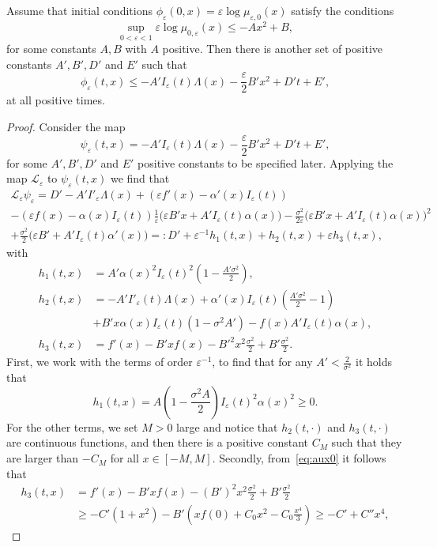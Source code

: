 \documentclass[onefignum,onetabnum]{siamart190516}
\newcommand{\1}{\mathbbm{1}}
\newcommand{\eps}{\varepsilon}
\begin{document}
\begin{proposition}
\label{prop:supersol}
Assume that initial conditions $\phi_\eps(0,x)=\eps\log\mu_{\eps,0}(x)$ satisfy the conditions
$$
\sup_{0<\eps<1}\eps\log \mu_{0,\eps}(x) \leq -Ax^2+B,
$$
for some constants $A,B$ with $A$ positive. Then there is another set of positive constants $A',B',D'$ and $E'$ such that
$$
\phi_\eps(t,x)\leq -A'I_\eps(t)\Lambda(x)-\frac{\eps}2 B'x^2+D't+E',
$$ 
at all positive times.
\end{proposition}

\begin{proof}
Consider the map
$$
\psi_\eps(t,x) = -A'I_\eps(t)\Lambda(x)-\frac{\eps}2 B'x^2+D't+E',
$$
for some $A',B',D'$ and $E'$ positive constants to be specified later. Applying the map $\mathcal L_\eps$ to $\psi_\eps(t,x)$ we find that
\begin{multline*}
\mathcal L_\eps\psi_\eps = D'-A'I'_\eps\Lambda(x)+\left(\eps f'(x) - \alpha'(x)I_{\eps}(t) \right)
\\
-  \left(\eps f(x)- \alpha(x) I_{\eps}(t)\right)\frac{1}{\eps}\Big(\eps B'x+A'I_\eps(t)\alpha(x)\Big)-\frac{\sigma^2}{2\eps}\Big(\eps B'x+A'I_\eps(t)\alpha(x)\Big)^2
\\
+\frac{\sigma^2}{2}\Big(\eps B'+A'I_\eps(t)\alpha'(x)\Big)=:D'+\eps^{-1} h_1(t,x)+h_2(t,x)+\eps h_3(t,x),
\end{multline*}
with
\begin{align*}
h_1(t,x) &= A'\alpha(x)^2I_\eps(t)^2\left(1-\frac{A'\sigma^2}{2}\right),
\\
h_2(t,x) &= -A'I'_\eps(t)\Lambda(x)+\alpha'(x)I_\eps(t)\left(\frac{A'\sigma^2}{2}-1\right)
\\
&+B'x\alpha(x)I_\eps(t)(1-\sigma^2 A') -f(x)A'I_\eps(t)\alpha(x),
\\
h_3(t,x) &= f'(x) - B'xf(x) - B'^2x^2\frac{\sigma^2}{2}+ B'\frac{\sigma^2}{2}.
\end{align*}
First, we work with the terms of order $\eps^{-1}$, to find that for any $A'<\frac{2}{\sigma^2}$ it holds that
$$
h_1(t,x)= A\left(1-\frac{\sigma^2 A}{2}\right)I_\eps(t)^2\alpha(x)^2\geq0.
$$
For the other terms, we set $M>0$ large and notice that $h_2(t,\cdot)$ and $h_3(t,\cdot)$ are continuous functions, and then there is a positive constant $C_M$ such that they are larger than $-C_M$ for all $x\in[-M,M]$. Secondly, from~\eqref{eq:aux0} it follows that
\begin{align*}
h_3(t,x) &= f'(x) - B'xf(x) - (B')^2x^2\frac{\sigma^2}{2}+ B'\frac{\sigma^2}{2}
\\
&\geq  - C'(1+x^2)- B'\left(xf(0)+C_0x^2-C_0\frac{x^4}3\right)\geq -C'+C''x^4,

\end{align*}
\end{proof}
\end{document}
